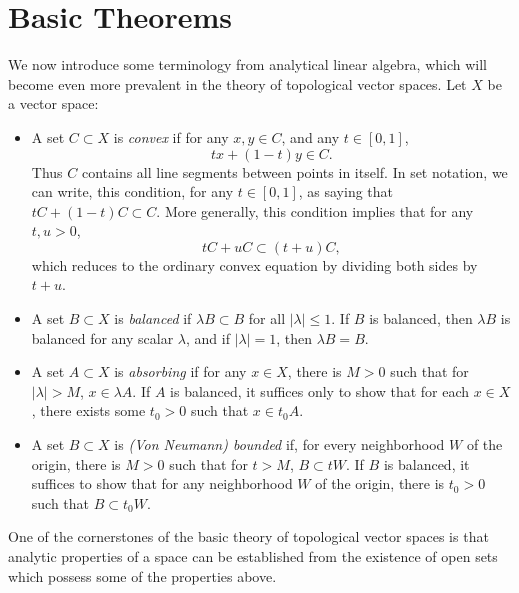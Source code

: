 \section{Basic Theorems}

We now introduce some terminology from analytical linear algebra, which will become even more prevalent in the theory of topological vector spaces. Let $X$ be a vector space:
%
\begin{itemize}
    \item A set $C \subset X$ is \emph{convex} if for any $x,y \in C$, and any $t \in [0,1]$,
    \[ tx + (1 - t)y \in C. \]
    Thus $C$ contains all line segments between points in itself. In set notation, we can write, this condition, for any $t \in [0,1]$, as saying that $tC + (1 - t)C \subset C$. More generally, this condition implies that for any $t,u > 0$,
    \[ tC + uC \subset (t + u) C, \]
    which reduces to the ordinary convex equation by dividing both sides by $t + u$.

    \item A set $B \subset X$ is \emph{balanced} if $\lambda B \subset B$ for all $|\lambda| \leq 1$. If $B$ is balanced, then $\lambda B$ is balanced for any scalar $\lambda$, and if $|\lambda| = 1$, then $\lambda B = B$.

    \item A set $A \subset X$ is \emph{absorbing} if for any $x \in X$, there is $M > 0$ such that for $|\lambda| > M$, $x \in \lambda A$. If $A$ is balanced, it suffices only to show that for each $x \in X$, there exists some $t_0 > 0$ such that $x \in t_0 A$.

    \item A set $B \subset X$ is \emph{(Von Neumann) bounded} if, for every neighborhood $W$ of the origin, there is $M > 0$ such that for $t > M$, $B \subset tW$. If $B$ is balanced, it suffices to show that for any neighborhood $W$ of the origin, there is $t_0 > 0$ such that $B \subset t_0 W$.

\end{itemize}
%
One of the cornerstones of the basic theory of topological vector spaces is that analytic properties of a space can be established from the existence of open sets which possess some of the properties above.

